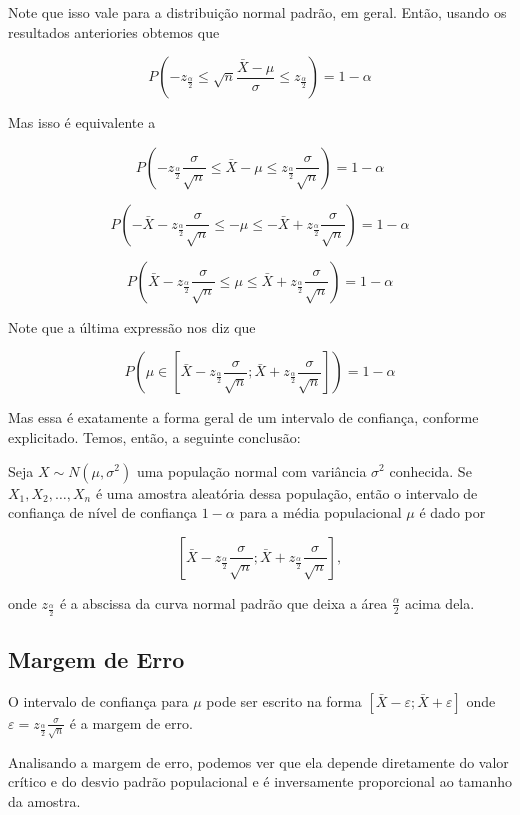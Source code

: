 \documentclass[
]{book}
\begin{document}
Note que isso vale para a distribuição normal padrão, em geral. Então, usando os resultados anteriories obtemos que

\[P\left(-z_\frac{\alpha}{2}\leq \sqrt{n}\frac{\bar X-\mu}{\sigma} \leq z_\frac{\alpha}{2}\right)=1-\alpha\]

Mas isso é equivalente a

\[P\left(-z_{\frac{\alpha}{2}}\frac{\sigma}{\sqrt{n}}\leq \bar X-\mu \leq z_{\frac{\alpha}{2}}\frac{\sigma}{\sqrt{n}}\right)= 1-\alpha\]

\[P\left(-\bar X-z_{\frac{\alpha}{2}}\frac{\sigma}{\sqrt{n}}\leq -\mu \leq -\bar X + z_{\frac{\alpha}{2}}\frac{\sigma}{\sqrt{n}}\right)= 1-\alpha\]

\[P\left(\bar X - z_{\frac{\alpha}{2}}\frac{\sigma}{\sqrt{n}} \leq \mu \leq \bar X+z_{\frac{\alpha}{2}}\frac{\sigma}{\sqrt{n}}\right) = 1-\alpha\]

Note que a última expressão nos diz que

\[P\left(\mu \in \left[\bar X-z_{\frac{\alpha}{2}}\frac{\sigma}{\sqrt{n}};\bar X+z_{\frac{\alpha}{2}}\frac{\sigma}{\sqrt{n}}\right]\right)=1-\alpha\]

Mas essa é exatamente a forma geral de um intervalo de confiança, conforme explicitado. Temos, então, a seguinte conclusão:

Seja \(X\sim N(\mu, \sigma^2)\) uma população normal com variância \(\sigma^2\) conhecida. Se \(X_1, X_2,\ldots , X_n\) é uma amostra aleatória dessa população, então o intervalo de confiança de nível de confiança \(1-\alpha\) para a média populacional \(\mu\) é dado por

\[\left[\bar X-z_{\frac{\alpha}{2}}\frac{\sigma}{\sqrt{n}};\bar X+z_{\frac{\alpha}{2}}\frac{\sigma}{\sqrt{n}}\right],\]

onde \(z_{\frac{\alpha}{2}}\) é a abscissa da curva normal padrão que deixa a área \(\frac{\alpha}{2}\) acima dela.

\hypertarget{margem-de-erro}{%
\subsection{Margem de Erro}\label{margem-de-erro}}

O intervalo de confiança para \(\mu\) pode ser escrito na forma \(\left[\bar X - \varepsilon;\bar X + \varepsilon \right]\) onde \(\varepsilon=z_{\frac{\alpha}{2}}\frac{\sigma}{\sqrt{n}}\) é a margem de erro.

Analisando a margem de erro, podemos ver que ela depende diretamente do valor crítico e do desvio padrão populacional e é inversamente proporcional ao tamanho da amostra.
\end{document}
